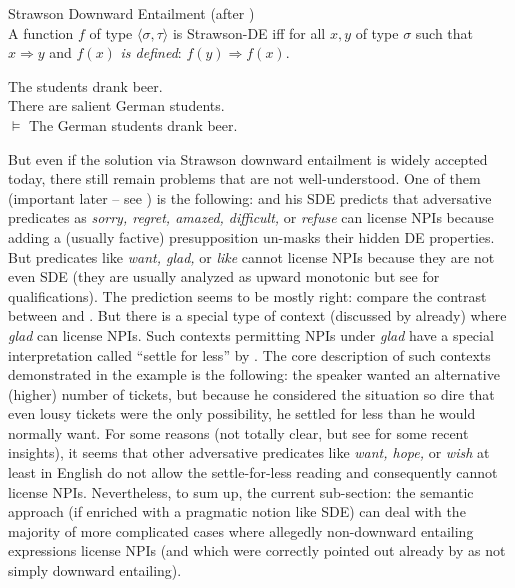 \documentclass[output=paper,colorlinks,citecolor=brown]{langscibook}
\begin{document}
\eanoraggedright\label{ex:19} Strawson Downward Entailment \hfill (after \citealt[104]{von1999npi})\\
A function $f$ of type $\langle \sigma,\tau\rangle$ is Strawson-DE iff for all $x, y$ of type $\sigma$ such that $x \Rightarrow y$ and $f(x)$ \textit{is defined}: $f(y) \Rightarrow f(x)$.
\z

\ea\label{ex:20} The students drank beer.\\
There are salient German students.\\
$\models$ The German students drank beer. 
\z

\noindent But even if the solution via Strawson downward entailment is widely accepted today, there still remain problems that are not well-understood. One of them (important later -- see ) is the following: \citet{von1999npi} and his SDE predicts that adversative predicates as \emph{sorry, regret, amazed, difficult,} or \emph{refuse} can license NPIs because adding a (usually factive) presupposition un-masks their hidden DE properties.
But predicates like \emph{want, glad,} or \emph{like} cannot license NPIs because they are not even SDE (they are usually analyzed as upward monotonic but see \citealt{von1999npi} for qualifications). The prediction seems to be mostly right: compare the contrast between  and . But there is a special type of context (discussed by \cite{kadmon1993any} already) where \emph{glad} can license NPIs. Such contexts permitting NPIs under \emph{glad} have a special interpretation called ``settle for less'' by \citet{kadmon1993any}. The core description of such contexts demonstrated in the example  is the following: the speaker wanted an alternative (higher) number of tickets, but because he considered the situation so dire that even lousy tickets were the only possibility, he settled for less than he would normally want. For some reasons (not totally clear, but see \citealt{alonso2016all} for some recent insights), it seems that other adversative predicates like \emph{want, hope,} or \emph{wish} at least in English do not allow the settle-for-less reading and consequently cannot license NPIs. Nevertheless, to sum up, the current sub-section: the semantic approach (if enriched with a pragmatic notion like SDE) can deal with the majority of more complicated cases where allegedly non-downward entailing expressions license NPIs (and which were correctly pointed out already by \citet{linebarger1987negative} as not simply downward entailing).
\end{document}
